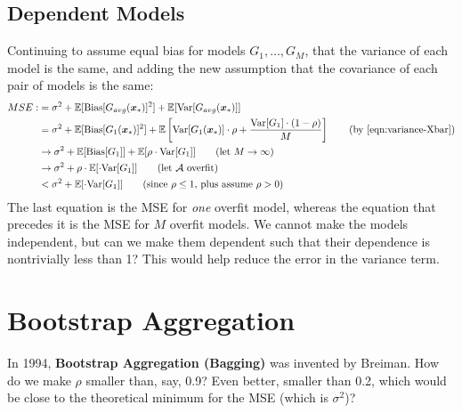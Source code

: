 \documentclass[12pt, a4paper]{article}
\theoremstyle{definition}
\begin{document}
	\subsection*{Dependent Models}
	Continuing to assume equal bias for models $G_1,\ldots,G_M$, that
	the variance of each model is the same, and adding the new assumption that
	the covariance of each pair of models is the same:
	\begin{align*}
		MSE :
		&=\sigma^2 + \mathbb{E}[\text{Bias}[G_{avg}(\bm{x}_*)]^2]
		+\mathbb{E}[\text{Var}[G_{avg}(\bm{x}_{*})]]\\
		&=\sigma^2 + \mathbb{E}[\text{Bias}[G_{1}(\bm{x}_*)]^2]
		+\mathbb{E}\left[\text{Var}[G_{1}(\bm{x}_{*})]\cdot \rho +
		\frac{\text{Var}[G_1]\cdot (1-\rho)}{M}
		 \right]
		 \tag{by \ref{eqn:variance-Xbar}}\\
 		&\to\sigma^2 + \mathbb{E}[\text{Bias}[G_1]] +
 		\mathbb{E}[\rho \cdot \text{Var}[G_1]]
 		\tag{let $M\to\infty$}\\
 		&\to\sigma^2+\rho \cdot \mathbb{E}[\cdot \text{Var}[G_1]]
 		\tag{let $\mathcal{A}$ overfit}\\
 		&<\sigma^2 + \mathbb{E}[\cdot \text{Var}[G_1]]
 		\tag{since $\rho \leq 1$, plus assume $\rho>0$}
	\end{align*}
	The last equation is the MSE for \textit{one} overfit model, whereas
	the equation that precedes it is the MSE for $M$ overfit models.
	We cannot make the models independent, but can we make them dependent
	such that their dependence is nontrivially less than 1? This would
	help reduce the error in the variance term.
	\section*{Bootstrap Aggregation}
	In 1994, \textbf{Bootstrap Aggregation (Bagging)} was invented by
	Breiman. How do we make $\rho$ smaller than, say, 0.9? Even better,
	smaller than 0.2, which would be close to the theoretical minimum
	for the MSE (which is $\sigma^2$)?
	
\end{document}
